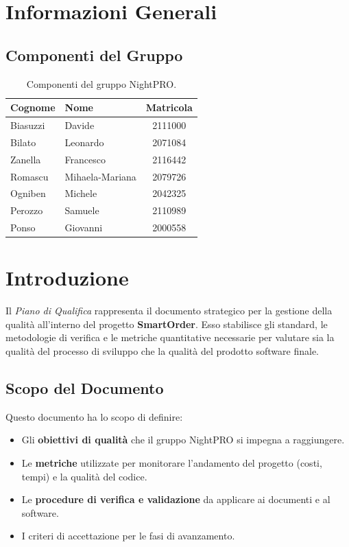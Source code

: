 \documentclass[a4paper,11pt,oneside]{scrartcl}
\begin{document}
\section*{Informazioni Generali}

\subsection*{Componenti del Gruppo}

\begin{table}[h!]
\centering
\renewcommand{\arraystretch}{1.2}
\begin{tabular}{@{}llc@{}}
\toprule
\textbf{Cognome} & \textbf{Nome} & \textbf{Matricola} \\
\midrule
Biasuzzi & Davide & 2111000 \\
Bilato & Leonardo & 2071084 \\
Zanella & Francesco & 2116442 \\
Romascu & Mihaela-Mariana & 2079726 \\
Ogniben & Michele & 2042325 \\
Perozzo & Samuele & 2110989 \\
Ponso & Giovanni & 2000558 \\
\bottomrule
\end{tabular}
\caption{Componenti del gruppo NightPRO.}
\end{table}

\newpage
\section{Introduzione}

Il \textit{Piano di Qualifica} rappresenta il documento strategico per la gestione della qualità all'interno del progetto \textbf{SmartOrder}. Esso stabilisce gli standard, le metodologie di verifica e le metriche quantitative necessarie per valutare sia la qualità del processo di sviluppo che la qualità del prodotto software finale.

\subsection{Scopo del Documento}
Questo documento ha lo scopo di definire:
\begin{itemize}
    \item Gli \textbf{obiettivi di qualità} che il gruppo NightPRO si impegna a raggiungere.
    \item Le \textbf{metriche} utilizzate per monitorare l'andamento del progetto (costi, tempi) e la qualità del codice.
    \item Le \textbf{procedure di verifica e validazione} da applicare ai documenti e al software.
    \item I criteri di accettazione per le fasi di avanzamento.
\end{itemize}
\end{document}
